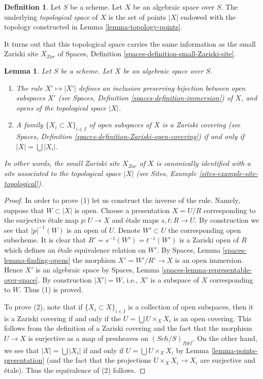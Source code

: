 \documentclass{stacks-project}
\theoremstyle{plain}
\newtheorem{lemma}[subsection]{Lemma}
\theoremstyle{definition}
\newtheorem{definition}[subsection]{Definition}
\theoremstyle{remark}
\numberwithin{equation}{subsection}
\def\Sch{\mathit{Sch}}
\begin{document}
\begin{definition}
\label{definition-topological-space}
Let $S$ be a scheme. Let $X$ be an algebraic space over $S$.
The underlying {\it topological space} of $X$ is the set of points
$|X|$ endowed with the topology constructed in
Lemma \ref{lemma-topology-points}.
\end{definition}

\noindent
It turns out that this topological space carries the same information
as the small Zariski site $X_{Zar}$ of
Spaces, Definition \ref{spaces-definition-small-Zariski-site}.

\begin{lemma}
\label{lemma-open-subspaces}
Let $S$ be a scheme.
Let $X$ be an algebraic space over $S$.
\begin{enumerate}
\item The rule $X' \mapsto |X'|$ defines an inclusion preserving
bijection between open subspaces $X'$ (see
Spaces, Definition \ref{spaces-definition-immersion})
of $X$, and opens of the topological space $|X|$.
\item A family $\{X_i \subset X\}_{i \in I}$ of open subspaces of $X$
is a Zariski covering (see
Spaces, Definition \ref{spaces-definition-Zariski-open-covering})
if and only if $|X| = \bigcup |X_i|$.
\end{enumerate}
In other words, the small Zariski site $X_{Zar}$ of $X$ is canonically
identified with a site associated to the topological space $|X|$ (see
Sites, Example \ref{sites-example-site-topological}).
\end{lemma}

\begin{proof}
In order to prove (1) let us construct the inverse of the rule.
Namely, suppose that $W \subset |X|$ is open. Choose a presentation
$X = U/R$ corresponding to the surjective \'etale map
$p : U \to X$ and \'etale maps $s, t : R \to U$.
By construction we see that $|p|^{-1}(W)$ is an
open of $U$. Denote $W' \subset U$ the corresponding open subscheme.
It is clear that $R' = s^{-1}(W') = t^{-1}(W')$ is a Zariski open
of $R$ which defines an \'etale equivalence relation on $W'$.
By Spaces, Lemma \ref{spaces-lemma-finding-opens} the morphism
$X' = W'/R' \to X$ is an open immersion. Hence $X'$ is an algebraic space
by Spaces, Lemma \ref{spaces-lemma-representable-over-space}.
By construction $|X'| = W$, i.e., $X'$ is a subspace of $X$
corresponding to $W$. Thus (1) is proved.

\medskip\noindent
To prove (2), note that if $\{X_i \subset X\}_{i \in I}$ is a collection
of open subspaces, then it is a Zariski covering if and only if the
$U = \bigcup U \times_X X_i$ is an open covering. This follows from
the definition of a Zariski covering and the fact that the morphism
$U \to X$ is surjective as a map of presheaves on $(\Sch/S)_{fppf}$.
On the other hand, we see that $|X| = \bigcup |X_i|$ if and only if
$U = \bigcup U \times_X X_i$ by Lemma \ref{lemma-points-presentation}
(and the fact that the projections $U \times_X X_i \to X_i$ are surjective
and \'etale). Thus the equivalence of (2) follows.
\end{proof}
\end{document}
